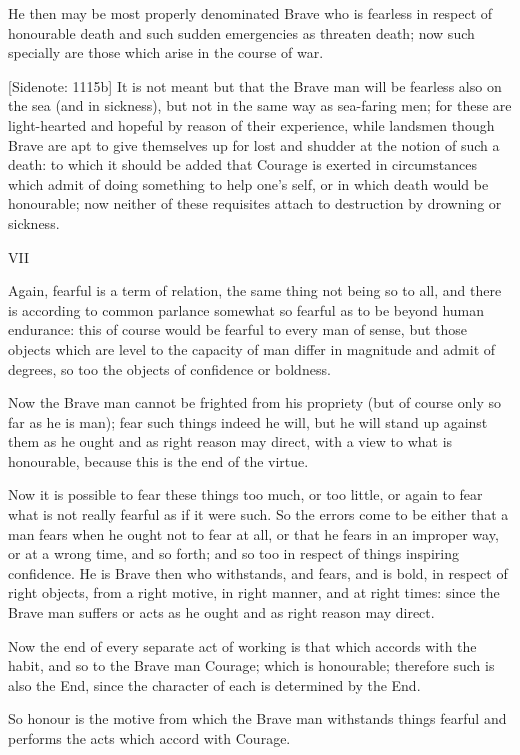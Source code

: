 He then may be most properly denominated Brave who is fearless in
respect of honourable death and such sudden emergencies as threaten
death; now such specially are those which arise in the course of war.

[Sidenote: 1115b] It is not meant but that the Brave man will be
fearless also on the sea (and in sickness), but not in the same way as
sea-faring men; for these are light-hearted and hopeful by reason of
their experience, while landsmen though Brave are apt to give themselves
up for lost and shudder at the notion of such a death: to which it
should be added that Courage is exerted in circumstances which admit
of doing something to help one's self, or in which death would be
honourable; now neither of these requisites attach to destruction by
drowning or sickness.



VII


Again, fearful is a term of relation, the same thing not being so to
all, and there is according to common parlance somewhat so fearful as to
be beyond human endurance: this of course would be fearful to every
man of sense, but those objects which are level to the capacity of
man differ in magnitude and admit of degrees, so too the objects of
confidence or boldness.

Now the Brave man cannot be frighted from his propriety (but of course
only so far as he is man); fear such things indeed he will, but he will
stand up against them as he ought and as right reason may direct, with a
view to what is honourable, because this is the end of the virtue.

Now it is possible to fear these things too much, or too little, or
again to fear what is not really fearful as if it were such. So the
errors come to be either that a man fears when he ought not to fear at
all, or that he fears in an improper way, or at a wrong time, and so
forth; and so too in respect of things inspiring confidence. He is
Brave then who withstands, and fears, and is bold, in respect of right
objects, from a right motive, in right manner, and at right times:
since the Brave man suffers or acts as he ought and as right reason may
direct.

Now the end of every separate act of working is that which accords
with the habit, and so to the Brave man Courage; which is honourable;
therefore such is also the End, since the character of each is
determined by the End.

So honour is the motive from which the Brave man withstands things
fearful and performs the acts which accord with Courage.

